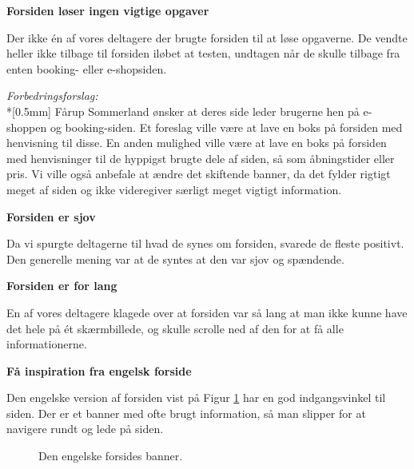 \documentclass[10pt,a4paper]{article}      %
\newcommand{\kommentar}[2]{\item[#1] \textbf{#2}\par\nopagebreak}{}
\newenvironment{forslag}{\emph{Forbedringsforslag:}\\*[0.5mm]}{}
\newcommand\pic[1]{\texttt{[image: Pics/\#1]}}
\renewcommand\good{\pic{good}}
\renewcommand\goodidea{\pic{goodidea}}
\renewcommand\smallproblem{\pic{smallproblem}}
\renewcommand\seriousproblem{\pic{seriousproblem}}
\begin{document}
\begin{kommentarer}
\kommentar{\seriousproblem}{Forsiden løser ingen vigtige opgaver}

Der ikke én af vores deltagere der brugte forsiden til at løse opgaverne. De
vendte heller ikke tilbage til forsiden iløbet at testen, undtagen når de skulle
tilbage fra enten booking- eller e-shopsiden.

\begin{forslag}
Fårup Sommerland ønsker at deres side leder brugerne hen på e-shoppen og booking-siden. Et foreslag ville være at lave en boks på forsiden med henvisning til disse. En anden mulighed ville være at lave en boks på forsiden med henvisninger til de hyppigst brugte dele af siden, så som åbningstider eller pris. Vi ville også anbefale at ændre det skiftende banner, da det fylder rigtigt meget af siden og ikke videregiver særligt meget vigtigt information.
\end{forslag}

\kommentar{\good}{Forsiden er sjov}

Da vi spurgte deltagerne til hvad de synes om forsiden, svarede de fleste
positivt. Den generelle mening var at de syntes at den var sjov og spændende.

\kommentar{\smallproblem}{Forsiden er for lang}

En af vores deltagere klagede over at forsiden var så lang at man ikke kunne
have det hele på ét skærmbillede, og skulle scrolle ned af den for at få alle
informationerne.

\kommentar{\goodidea}{Få inspiration fra engelsk forside}

Den engelske version af forsiden vist på Figur \ref{fig:engelskbanner} har en
god indgangsvinkel til siden. Der er et banner med ofte brugt information, så
man slipper for at navigere rundt og lede på siden.
\end{kommentarer}


\begin{figure}[htbp]
    \centering
    \caption{Den engelske forsides banner.}
    \label{fig:engelskbanner}
\end{figure}
\end{document}
